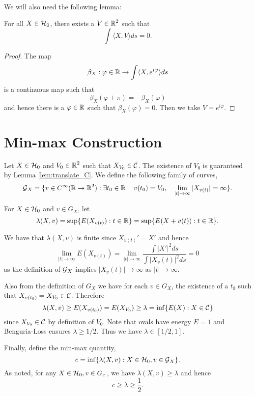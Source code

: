 \documentclass[12pt]{article}
\begin{document}
We will also need the following lemma:

\begin{lemma}
\label{lem:projection_C}
For all \(X \in \operatorname{\operatorname{\mathcal{H}}_0}\), there exists a \(V \in \operatorname{\mathbb{R}}^2\) such that
\[
\int \langle X, V \rangle ds = 0.
\]
\end{lemma}

\begin{proof}
The map
\[
\beta_X : \varphi \in \operatorname{\mathbb{R}} \to \int \langle X, e^{i\varphi} \rangle ds
\]
is a continuous map such that
\[
\beta_X(\varphi + \pi) = -\beta_X(\varphi)
\]
and hence there is a \(\varphi \in \operatorname{\mathbb{R}}\) such that \(\beta_X(\varphi) = 0\). Then we take \(V = e^{i\varphi}\).
\end{proof}

\section{Min-max Construction}
\label{sec-2}

Let \(X \in \operatorname{\operatorname{\mathcal{H}}_0}\) and \(V_0 \in \operatorname{\mathbb{R}}^2\) such that \(X_{V_0} \in \operatorname{\mathcal{C}}\). The existence of \(V_0\) is guaranteed by Lemma \ref{lem:translate_C}. We define the following family of curves,
\[
\operatorname{\mathcal{G}}_X = \lbrace v \in C^{\infty}(\operatorname{\mathbb{R}} \to \operatorname{\mathbb{R}}^2) : \exists t_0 \in \operatorname{\mathbb{R}} \quad v(t_0) = V_0, \quad \lim_{|t| \to \infty} |X_{v(t)}| = \infty \rbrace.
\]

For \(X \in \operatorname{\operatorname{\mathcal{H}}_0}\) and \(v \in G_X\), let
\[
\lambda(X, v) = \sup \lbrace E(X_{v(t)}) : t \in \operatorname{\mathbb{R}} \rbrace = \sup \lbrace E(X + v(t)) : t \in \operatorname{\mathbb{R}} \rbrace.
\]

We have that \(\lambda(X, v)\) is finite since \(X_{v(t)}' = X'\) and hence
\[
\lim_{|t| \to \infty} E(X_{v(t)}) = \lim_{|t| \to \infty} \frac{\int |X'|^2 ds}{\int |X_v(t)|^2 ds} = 0
\]
as the definition of \(\operatorname{\mathcal{G}}_X\) implies \(|X_v(t)| \to \infty\) as \(|t| \to \infty\).

Also from the definition of \(G_X\) we have for each \(v \in G_X\), the existence of a \(t_0\) such that \(X_{v(t_0)} = X_{V_0} \in \operatorname{\mathcal{C}}\). Therefore
\[
\lambda(X, v) \geq E(X_{v(t_0)}) = E(X_{V_0}) \geq \lambda = \inf\lbrace E(X) : X \in \operatorname{\mathcal{C}}\rbrace
\]
since \(X_{V_0} \in \operatorname{\mathcal{C}}\) by definition of \(V_0\). Note that ovals have energy \(E = 1\) and Benguria-Loss ensures \(\lambda \geq 1/2\). Thus we have \(\lambda \in [1/2, 1]\).

Finally, define the min-max quantity,
\[
c = \inf \lbrace \lambda(X, v) : X \in \operatorname{\operatorname{\mathcal{H}}_0}, v \in \operatorname{\mathcal{G}}_X \rbrace.
\]
As noted, for any \(X \in \operatorname{\operatorname{\mathcal{H}}_0}, v \in G_x\), we have \(\lambda(X, v) \geq \lambda\) and hence
\[
c \geq \lambda \geq \frac{1}{2}.
\]
\end{document}
